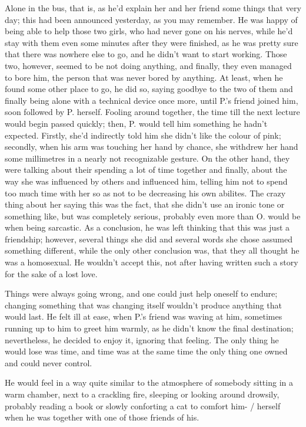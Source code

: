 Alone in the bus, that is, as he'd explain her and her friend some things that very day; this had been announced yesterday, as you may remember. He was happy of being able to help those two girls, who had never gone on his nerves, while he'd stay with them even some minutes after they were finished, as he was pretty sure that there was nowhere else to go, and he didn't want to start working. Those two, however, seemed to be not doing anything, and finally, they even managed to bore him, the person that was never bored by anything. At least, when he found some other place to go, he did so, saying goodbye to the two of them and finally being alone with a technical device once more, until P.'s friend joined him, soon followed by P. herself. Fooling around together, the time till the next lecture would begin passed quickly; then, P. would tell him something he hadn't expected. Firstly, she'd indirectly told him she didn't like the colour of pink; secondly, when his arm was touching her hand by chance, she withdrew her hand some millimetres in a nearly not recognizable gesture. On the other hand, they were talking about their spending a lot of time together and finally, about the way she was influenced by others and influenced him, telling him not to spend too much time with her so as not to be decreasing his own abilites. The crazy thing about her saying this was the fact, that she didn't use an ironic tone or something like, but was completely serious, probably even more than O. would be when being sarcastic. As a conclusion, he was left thinking that this was just a friendship; however, several things she did and several words she chose assumed something different, while the only other conclusion was, that they all thought he was a homosexual.
He wouldn't accept this, not after having written such a story for the sake of a lost love. 

Things were always going wrong, and one could just help oneself to endure; changing something that was changing itself wouldn't produce anything that would last. 
He felt ill at ease, when P.'s friend was waving at him, sometimes running up to him to greet him warmly, as he didn't know the final destination; nevertheless, he decided to enjoy it, ignoring that feeling. 
The only thing he would lose was time, and time was at the same time the only thing one owned and could never control.

He would feel in a way quite similar to the atmosphere of somebody sitting in a warm chamber, next to a crackling fire, sleeping or looking around drowsily, probably reading a book or slowly conforting a cat to comfort him- / herself when he was together with one of those friends of his.

